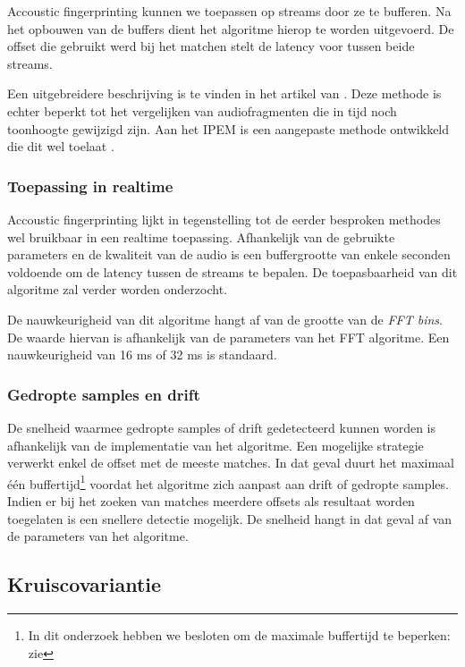 Accoustic fingerprinting kunnen we toepassen op streams door ze te bufferen. Na het opbouwen van de buffers dient het algoritme hierop te worden uitgevoerd. De offset die gebruikt werd bij het matchen stelt de latency voor tussen beide streams.

Een uitgebreidere beschrijving is te vinden in het artikel van . Deze methode is echter beperkt tot het vergelijken van audiofragmenten die in tijd noch toonhoogte gewijzigd zijn. Aan het IPEM is een aangepaste methode ontwikkeld die dit wel toelaat \cite{six2014panako}.

\subsubsection{Toepassing in realtime}

Accoustic fingerprinting lijkt in tegenstelling tot de eerder besproken methodes wel bruikbaar in een realtime toepassing. Afhankelijk van de gebruikte parameters en de kwaliteit van de audio is een buffergrootte van enkele seconden voldoende om de latency tussen de streams te bepalen. De toepasbaarheid van dit algoritme zal verder worden onderzocht.

De nauwkeurigheid van dit algoritme hangt af van de grootte van de \textit{FFT bins}. De waarde hiervan is afhankelijk van de parameters van het FFT algoritme. Een nauwkeurigheid van 16 ms of 32 ms is standaard.

\subsubsection{Gedropte samples en drift}

De snelheid waarmee gedropte samples of drift gedetecteerd kunnen worden is afhankelijk van de implementatie van het algoritme. Een mogelijke strategie verwerkt enkel de offset met de meeste matches. In dat geval duurt het maximaal één buffertijd\footnote{In dit onderzoek hebben we besloten om de maximale buffertijd te beperken: zie } voordat het algoritme zich aanpast aan drift of gedropte samples. Indien er bij het zoeken van matches meerdere offsets als resultaat worden toegelaten is een snellere detectie mogelijk. De snelheid hangt in dat geval af van de parameters van het algoritme.

\subsection{Kruiscovariantie}

